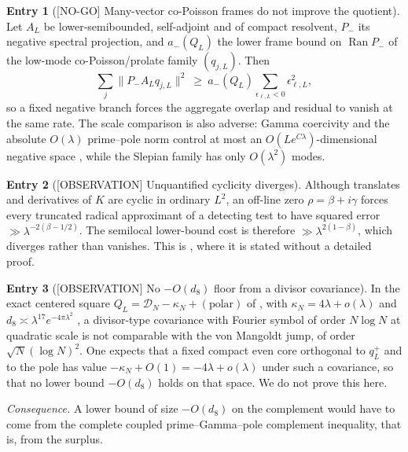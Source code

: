 \documentclass[11pt]{amsart}
\theoremstyle{definition}
\newcounter{family}
\newtheorem{entry}{Entry}[family]
\theoremstyle{remark}
\DeclareMathOperator{\Ran}{Ran}
\newcommand{\NOGO}{\textup{[NO-GO]}}
\newcommand{\OBS}{\textup{[OBSERVATION]}}
\begin{document}
\begin{entry}[\NOGO{} Many-vector co-Poisson frames do not improve the quotient]
\label{ent:H2}
Let \(A_L\) be lower-semibounded, self-adjoint and of compact resolvent,
\(P_-\) its negative spectral projection, and \(a_-(Q_L)\) the lower frame
bound on \(\Ran P_-\) of the low-mode co-Poisson/prolate family
\((q_{j,L})\).  Then \cite[Theorem~16.1, (16.2)]{TrejoPizzo39}
\[
 \sum_j\|P_-A_Lq_{j,L}\|^2\ \ge\ a_-(Q_L)
 \sum_{\epsilon_{\ell,L}<0}\epsilon_{\ell,L}^2 ,
\tag{11.1}
\]
so a fixed negative branch forces the aggregate overlap and residual to
vanish at the same rate.  The scale comparison is also adverse: Gamma
coercivity and the absolute \(O(\lambda)\) prime--pole norm control at most
an \(O(Le^{C\lambda})\)-dimensional negative space
\cite[(16.3)]{TrejoPizzo39}, while the Slepian family has only
\(O(\lambda^2)\) modes.
\end{entry}

\begin{entry}[\OBS{} Unquantified cyclicity diverges]
\label{ent:H3}
Although translates and derivatives of \(K\) are cyclic in ordinary
\(L^2\), an off-line zero \(\rho=\beta+i\gamma\) forces every truncated
radical approximant of a detecting test to have squared error
\(\gg\lambda^{-2(\beta-1/2)}\).  The semilocal lower-bound cost is
therefore \(\gg\lambda^{2(1-\beta)}\), which diverges rather than
vanishes.  This is \cite[(22.9)]{TrejoPizzo39}, where it is stated
without a detailed proof.
\end{entry}

\begin{entry}[\OBS{} No \(-O(d_8)\) floor from a divisor covariance]
\label{ent:H4}
In the exact centered square
\(Q_L=\mathcal D_N-\kappa_N+(\text{polar})\) of
\cite[Theorem~19.1]{TrejoPizzo39}, with
\(\kappa_N=4\lambda+o(\lambda)\) \cite[(19.5)]{TrejoPizzo39} and
\(d_8\asymp\lambda^{17}e^{-4\pi\lambda^2}\) \cite[Section~15]{TrejoPizzo39},
a divisor-type covariance with Fourier symbol of order \(N\log N\) at
quadratic scale is not comparable with the von Mangoldt jump, of order
\(\sqrt N(\log N)^2\).  One expects that a fixed compact even core
orthogonal to \(q_L^+\) and to the pole has value
\(-\kappa_N+O(1)=-4\lambda+o(\lambda)\) under such a covariance, so that
no lower bound \(-O(d_8)\) holds on that space.  We do not prove this
here.
\end{entry}

\emph{Consequence.} A lower bound of size \(-O(d_8)\) on the complement
would have to come from the complete coupled prime--Gamma--pole
complement inequality, that is, from the surplus.
\end{document}
